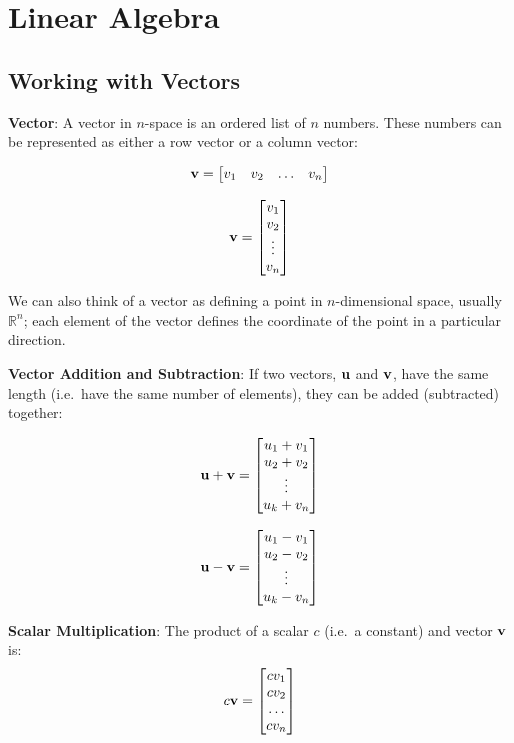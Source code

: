 \documentclass[
  letterpaper,
]{book}
\theoremstyle{definition}
\theoremstyle{definition}
\theoremstyle{plain}
\theoremstyle{definition}
\theoremstyle{plain}
\theoremstyle{plain}
\theoremstyle{remark}
\begin{document}
\hypertarget{linearalgebra}{%
\chapter{Linear Algebra}\label{linearalgebra}}

\hypertarget{vector-def}{%
\section{Working with Vectors}\label{vector-def}}

\textbf{Vector}: A vector in \(n\)-space is an ordered list of \(n\)
numbers. These numbers can be represented as either a row vector or a
column vector:

\[{\bf v} = \begin{bmatrix} v_1 & v_2 & \dots & v_n\end{bmatrix}\]

\[{\bf v} = \begin{bmatrix} v_1 \\ v_2 \\ \vdots \\ v_n \end{bmatrix}\]

We can also think of a vector as defining a point in \(n\)-dimensional
space, usually \(\mathbb{R}^n\); each element of the vector defines the
coordinate of the point in a particular direction.

\textbf{Vector Addition and Subtraction}: If two vectors, \({\bf u}\)
and \({\bf v}\), have the same length (i.e.~have the same number of
elements), they can be added (subtracted) together:

\[{\bf u} + {\bf v} = \begin{bmatrix} u_1 + v_1 \\ u_2 + v_2 \\ \vdots \\ u_k + v_n \end{bmatrix}\]

\[{\bf u} - {\bf v} = \begin{bmatrix} u_1 - v_1 \\ u_2 - v_2 \\ \vdots \\ u_k - v_n \end{bmatrix}\]

\textbf{Scalar Multiplication}: The product of a scalar \(c\) (i.e.~a
constant) and vector \({\bf v}\) is:\\

\[ c{\bf v} =  \begin{bmatrix} cv_1 \\ cv_2 \\ \dots \\ cv_n \end{bmatrix} \]
\end{document}
